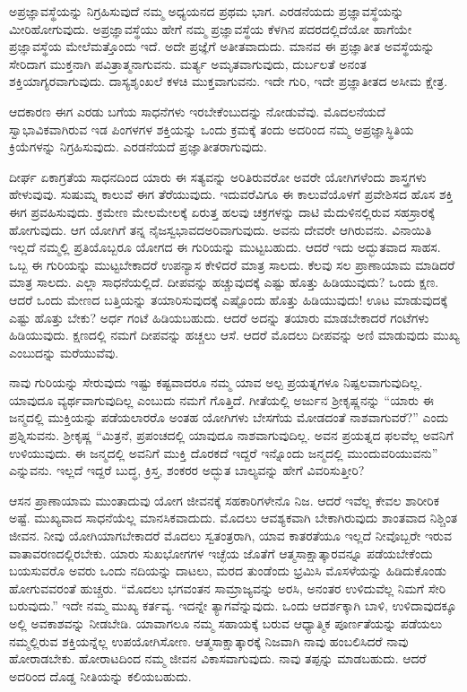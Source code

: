 ಅಪ್ರಜ್ಞಾವಸ್ಥೆಯನ್ನು ನಿಗ್ರಹಿಸುವುದೆ ನಮ್ಮ ಅಧ್ಯಯನದ ಪ್ರಥಮ ಭಾಗ. ಎರಡನೆಯದು ಪ್ರಜ್ಞಾವಸ್ಥೆಯನ್ನು ಮೀರಿಹೋಗುವುದು. ಅಪ್ರಜ್ಞಾವಸ್ಥೆಯು ಹೇಗೆ ನಮ್ಮ ಪ್ರಜ್ಞಾವಸ್ಥೆಯ ಕೆಳಗಿನ ಪದರದಲ್ಲಿದೆಯೋ ಹಾಗೆಯೇ ಪ್ರಜ್ಞಾವಸ್ಥೆಯ ಮೇಲೆ\break ಮತ್ತೊಂದು ಇದೆ. ಅದೇ ಪ್ರಜ್ಞೆಗೆ ಅತೀತವಾದುದು. ಮಾನವ ಈ ಪ್ರಜ್ಞಾತೀತ ಅವಸ್ಥೆಯನ್ನು ಸೇರಿದಾಗ ಮುಕ್ತನಾಗಿ ಪವಿತ್ರಾತ್ಮನಾಗುವನು. ಮರ್ತ್ಯ ಅಮೃತವಾಗುವುದು, ದುರ್ಬಲತೆ ಅನಂತ ಶಕ್ತಿಯಾಗ್ಯರವಾಗುವುದು. ದಾಸ್ಯಶೃಂಖಲೆ ಕಳಚಿ ಮುಕ್ತವಾಗುವನು. ಇದೇ ಗುರಿ, ಇದೇ ಪ್ರಜ್ಞಾತೀತದ ಅಸೀಮ ಕ್ಷೇತ್ರ.

ಆದಕಾರಣ ಈಗ ಎರಡು ಬಗೆಯ ಸಾಧನೆಗಳು ಇರಬೇಕೆಂಬುದನ್ನು ನೋಡುವೆವು. ಮೊದಲನೆಯದೆ ಸ್ವಾಭಾವಿಕವಾಗಿರುವ ಇಡ ಪಿಂಗಳಗಳ ಶಕ್ತಿಯನ್ನು ಒಂದು ಕ್ರಮಕ್ಕೆ ತಂದು ಅದರಿಂದ ನಮ್ಮ ಅಪ್ರಜ್ಞಾಸ್ಥಿತಿಯ ಕ್ರಿಯೆಗಳನ್ನು ನಿಗ್ರಹಿಸುವುದು. ಎರಡನೆಯದೆ ಪ್ರಜ್ಞಾತೀತರಾಗುವುದು.

ದೀರ್ಘ ಏಕಾಗ್ರತೆಯ ಸಾಧನದಿಂದ ಯಾರು ಈ ಸತ್ಯವನ್ನು ಅರಿತಿರುವರೋ ಅವರೇ ಯೋಗಿಗಳೆಂದು ಶಾಸ್ತ್ರಗಳು ಹೇಳುವುವು. ಸುಷುಮ್ನ ಕಾಲುವೆ ಈಗ ತೆರೆಯುವುದು. ಇದುವರೆವಿಗೂ ಈ ಕಾಲುವೆಯೊಳಗೆ ಪ್ರವೇಶಿಸದ ಹೊಸ ಶಕ್ತಿ ಈಗ ಪ್ರವಹಿಸುವುದು. ಕ್ರಮೇಣ ಮೇಲಮೇಲಕ್ಕೆ ಏರುತ್ತ ಹಲವು ಚಕ್ರಗಳನ್ನು ದಾಟಿ ಮೆದುಳಿನಲ್ಲಿರುವ ಸಹಸ್ರಾರಕ್ಕೆ ಹೋಗುವುದು. ಆಗ ಯೋಗಿಗೆ ತನ್ನ ನೈಜಸ್ವಭಾವದ\break ಅರಿವಾಗುವುದು. ಅವನು ದೇವರೇ ಆಗಿರುವನು. ವಿನಾಯಿತಿ ಇಲ್ಲದೆ ನಮ್ಮಲ್ಲಿ ಪ್ರತಿಯೊಬ್ಬರೂ ಯೋಗದ ಈ ಗುರಿಯನ್ನು ಮುಟ್ಟಬಹುದು. ಆದರೆ ಇದು ಅದ್ಭುತವಾದ ಸಾಹಸ. ಒಬ್ಬ ಈ ಗುರಿಯನ್ನು ಮುಟ್ಟಬೇಕಾದರೆ ಉಪನ್ಯಾಸ ಕೇಳಿದರೆ ಮಾತ್ರ ಸಾಲದು. ಕೆಲವು ಸಲ ಪ್ರಾಣಾಯಾಮ ಮಾಡಿದರೆ ಮಾತ್ರ ಸಾಲದು. ಎಲ್ಲಾ ಸಾಧನೆಯಲ್ಲಿದೆ. ದೀಪವನ್ನು ಹಚ್ಚುವುದಕ್ಕೆ ಎಷ್ಟು ಹೊತ್ತು ಹಿಡಿಯುವುದು? ಒಂದು ಕ್ಷಣ. ಆದರೆ ಒಂದು ಮೇಣದ ಬತ್ತಿಯನ್ನು ತಯಾರಿಸುವುದಕ್ಕೆ ಎಷ್ಟೊಂದು ಹೊತ್ತು ಹಿಡಿಯುವುದು! ಊಟ ಮಾಡುವುದಕ್ಕೆ ಎಷ್ಟು ಹೊತ್ತು ಬೇಕು? ಅರ್ಧ ಗಂಟೆ ಹಿಡಿಯಬಹುದು. ಆದರೆ ಅದನ್ನು ತಯಾರು ಮಾಡಬೇಕಾದರೆ ಗಂಟೆಗಳು ಹಿಡಿಯುವುದು. ಕ್ಷಣದಲ್ಲಿ ನಮಗೆ ದೀಪವನ್ನು ಹಚ್ಚಲು ಆಸೆ. ಆದರೆ ಮೊದಲು ದೀಪವನ್ನು ಅಣಿ ಮಾಡುವುದು ಮುಖ್ಯ ಎಂಬುದನ್ನು ಮರೆಯುವೆವು.

ನಾವು ಗುರಿಯನ್ನು ಸೇರುವುದು ಇಷ್ಟು ಕಷ್ಟವಾದರೂ ನಮ್ಮ ಯಾವ ಅಲ್ಪ ಪ್ರಯತ್ನಗಳೂ ನಿಷ್ಪಲವಾಗುವುದಿಲ್ಲ. ಯಾವುದೂ ವ್ಯರ್ಥವಾಗುವುದಿಲ್ಲ ಎಂಬುದು ನಮಗೆ ಗೊತ್ತಿದೆ. ಗೀತೆಯಲ್ಲಿ ಅರ್ಜುನ ಶ‍್ರೀಕೃಷ್ಣನನ್ನು “ಯಾರು ಈ ಜನ್ಮದಲ್ಲಿ ಮುಕ್ತಿಯನ್ನು ಪಡೆಯಲಾರರೊ ಅಂತಹ ಯೋಗಿಗಳು ಬೇಸಗೆಯ ಮೋಡದಂತೆ ನಾಶವಾಗುವರೆ?'' ಎಂದು ಪ್ರಶ್ನಿಸುವನು. ಶ‍್ರೀಕೃಷ್ಣ “ಮಿತ್ರನೆ, ಪ್ರಪಂಚದಲ್ಲಿ ಯಾವುದೂ ನಾಶವಾಗುವುದಿಲ್ಲ. ಅವನ ಪ್ರಯತ್ನದ ಫಲವೆಲ್ಲ ಅವನಿಗೆ ಉಳಿಯುವುದು. ಈ ಜನ್ಮದಲ್ಲಿ ಅವನಿಗೆ ಮುಕ್ತಿ ದೊರಕದೆ ಇದ್ದರೆ ಇನ್ನೊಂದು ಜನ್ಮದಲ್ಲಿ ಮುಂದುವರಿಯುವನು” ಎನ್ನುವನು. ಇಲ್ಲದೆ ಇದ್ದರೆ ಬುದ್ಧ, ಕ್ರಿಸ್ತ, ಶಂಕರರ ಅದ್ಭುತ ಬಾಲ್ಯವನ್ನು ಹೇಗೆ ವಿವರಿಸುತ್ತೀರಿ?

ಆಸನ ಪ್ರಾಣಾಯಾಮ ಮುಂತಾದುವು ಯೋಗ ಜೀವನಕ್ಕೆ ಸಹಕಾರಿಗಳೇನೊ ನಿಜ. ಆದರೆ ಇವೆಲ್ಲ ಕೇವಲ ಶಾರೀರಿಕ ಅಷ್ಟೆ. ಮುಖ್ಯವಾದ ಸಾಧನೆಯೆಲ್ಲ ಮಾನಸಿಕವಾದುದು. ಮೊದಲು ಆವಶ್ಯಕವಾಗಿ ಬೇಕಾಗಿರುವುದು ಶಾಂತವಾದ ನಿಶ್ಚಿಂತ ಜೀವನ. ನೀವು ಯೋಗಿಯಾಗಬೇಕಾದರೆ ಮೊದಲು ಸ್ವತಂತ್ರರಾಗಿ, ಯಾವ ಕಾತರತೆಯೂ ಇಲ್ಲದೆ ನೀವೊಬ್ಬರೇ ಇರುವ ವಾತಾವರಣದಲ್ಲಿರಬೇಕು. ಯಾರು ಸುಖಭೋಗಗಳ ಇಚ್ಛೆಯ ಜೊತೆಗೆ ಆತ್ಮಸಾಕ್ಷಾತ್ಕಾರವನ್ನೂ ಪಡೆಯಬೇಕೆಂದು ಬಯಸುವರೊ ಅವರು ಒಂದು ನದಿಯನ್ನು ದಾಟಲು, ಮರದ ತುಂಡೆಂದು ಭ್ರಮಿಸಿ ಮೊಸಳೆಯನ್ನು ಹಿಡಿದುಕೊಂಡು ಹೋಗುವವರಂತೆ ಹುಚ್ಚರು. “ಮೊದಲು ಭಗವಂತನ ಸಾಮ್ರಾಜ್ಯವನ್ನು ಅರಸಿ, ಅನಂತರ ಉಳಿದುವೆಲ್ಲ ನಿಮಗೆ ಸೇರಿ ಬರುವುದು.'' ಇದೇ ನಮ್ಮ ಮುಖ್ಯ ಕರ್ತವ್ಯ. ಇದನ್ನೇ ತ್ಯಾಗವೆನ್ನುವುದು. ಒಂದು ಆದರ್ಶಕ್ಕಾಗಿ ಬಾಳಿ, ಉಳಿದಾವುದಕ್ಕೂ ಅಲ್ಲಿ ಅವಕಾಶವನ್ನು ನೀಡಬೇಡಿ. ಯಾವಾಗಲೂ ನಮ್ಮ ಸಹಾಯಕ್ಕೆ ಬರುವ ಆಧ್ಯಾತ್ಮಿಕ ಪೂರ್ಣತೆಯನ್ನು ಪಡೆಯಲು ನಮ್ಮಲ್ಲಿರುವ ಶಕ್ತಿಯನ್ನೆಲ್ಲ ಉಪಯೋಗಿಸೋಣ. ಆತ್ಮಸಾಕ್ಷಾತ್ಕಾರಕ್ಕೆ ನಿಜವಾಗಿ ನಾವು ಹಂಬಲಿಸಿದರೆ ನಾವು ಹೋರಾಡಬೇಕು. ಹೋರಾಟದಿಂದ ನಮ್ಮ ಜೀವನ ವಿಕಾಸವಾಗುವುದು. ನಾವು ತಪ್ಪನ್ನು ಮಾಡಬಹುದು. ಆದರೆ ಅದರಿಂದ ದೊಡ್ಡ ನೀತಿಯನ್ನು ಕಲಿಯಬಹುದು.

